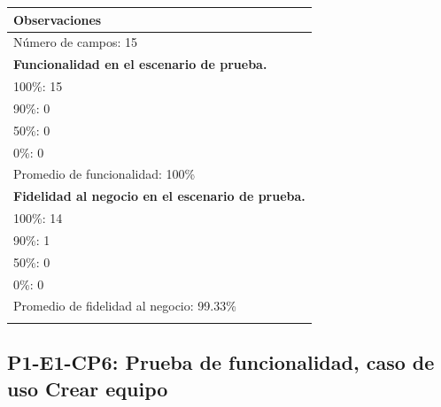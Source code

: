 \documentclass[oneside,10pt]{book}
\begin{document}
\begin{tabularx}{\textwidth}{ X }
\multicolumn{1}{X}{\cellcolor[HTML]{9B9B9B}\textbf{Observaciones}} \\ \hline
\multicolumn{1}{|l|}{Número de campos: 15 }	\\
\multicolumn{1}{|l|}{\textbf{Funcionalidad en el escenario de prueba.} }	\\
\multicolumn{1}{|l|}{100\%: 15 }	\\
\multicolumn{1}{|l|}{90\%: 0 }	\\
\multicolumn{1}{|l|}{50\%: 0 }	\\
\multicolumn{1}{|l|}{0\%: 0 }	\\
\multicolumn{1}{|l|}{Promedio de funcionalidad: 100\% }	\\
\multicolumn{1}{|l|}{\textbf{Fidelidad al negocio en el escenario de prueba.} }	\\
\multicolumn{1}{|l|}{100\%: 14 }	\\
\multicolumn{1}{|l|}{90\%: 1 }	\\
\multicolumn{1}{|l|}{50\%: 0 }	\\
\multicolumn{1}{|l|}{0\%: 0 }	\\
\multicolumn{1}{|l|}{Promedio de fidelidad al negocio: 99.33\% }	\\
\multicolumn{1}{|l|}{ }	\\ \hline
\end{tabularx}
\newpage
\subsection{P1-E1-CP6: Prueba de funcionalidad, caso de uso Crear equipo}
\end{document}
